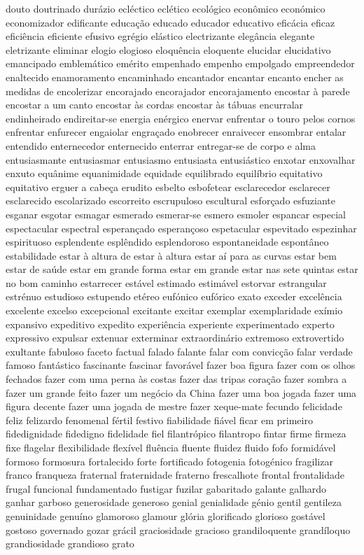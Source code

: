 \documentclass[ruledheader]{abnt_UFF}
\begin{document}
douto doutrinado dur\'{a}zio ecl\'{e}ctico ecl\'{e}tico ecol\'{o}gico econ\^{o}mico econ\'{o}mico economizador edificante educa\c{c}\~ao educado educador educativo efic\'{a}cia eficaz efici\^{e}ncia eficiente efusivo egr\'{e}gio el\'{a}stico electrizante eleg\^{a}ncia elegante eletrizante eliminar elogio elogioso eloqu\^{e}ncia eloquente elucidar elucidativo emancipado emblem\'{a}tico em\'{e}rito empenhado empenho empolgado empreendedor enaltecido enamoramento encaminhado encantador encantar encanto encher as medidas de encolerizar encorajado encorajador encorajamento encostar \`{a} parede encostar a um canto encostar \`{a}s cordas encostar \`{a}s t\'{a}buas encurralar endinheirado endireitar-se energia en\'{e}rgico enervar enfrentar o touro pelos cornos enfrentar enfurecer engaiolar engra\c{c}ado enobrecer enraivecer ensombrar entalar entendido enternecedor enternecido enterrar entregar-se de corpo e alma entusiasmante entusiasmar entusiasmo entusiasta entusi\'{a}stico enxotar enxovalhar enxuto equ\^{a}nime equanimidade equidade equilibrado equil\'{i}brio equitativo equitativo erguer a cabe\c{c}a erudito esbelto esbofetear esclarecedor esclarecer esclarecido escolarizado escorreito escrupuloso escultural esfor\c{c}ado esfuziante esganar esgotar esmagar esmerado esmerar-se esmero esmoler espancar especial espectacular espectral esperan\c{c}ado esperan\c{c}oso espetacular espevitado espezinhar espirituoso esplendente espl\^{e}ndido esplendoroso espontaneidade espont\^{a}neo estabilidade estar \`{a} altura de estar \`{a} altura estar a\'{i} para as curvas estar bem estar de sa\'{u}de estar em grande forma estar em grande estar nas sete quintas estar no bom caminho estarrecer est\'{a}vel estimado estim\'{a}vel estorvar estrangular estr\'{e}nuo estudioso estupendo et\'{e}reo euf\'{o}nico euf\'{o}rico exato exceder excel\^{e}ncia excelente excelso excepcional excitante excitar exemplar exemplaridade ex\'{i}mio expansivo expeditivo expedito experi\^{e}ncia experiente experimentado experto expressivo expulsar extenuar exterminar extraordin\'{a}rio extremoso extrovertido exultante fabuloso faceto factual falado falante falar com convic\c{c}\~ao falar verdade famoso fant\'{a}stico fascinante fascinar favor\'{a}vel fazer boa figura fazer com os olhos fechados fazer com uma perna \`{a}s costas fazer das tripas cora\c{c}\~ao fazer sombra a fazer um grande feito fazer um neg\'{o}cio da China fazer uma boa jogada fazer uma figura decente fazer uma jogada de mestre fazer xeque-mate fecundo felicidade feliz felizardo fenomenal f\'{e}rtil festivo fiabilidade fi\'{a}vel ficar em primeiro fidedignidade fidedigno fidelidade fiel filantr\'{o}pico filantropo fintar firme firmeza fixe flagelar flexibilidade flex\'{i}vel flu\^{e}ncia fluente fluidez fluido fofo formid\'{a}vel formoso formosura fortalecido forte fortificado fotogenia fotog\'{e}nico fragilizar franco franqueza fraternal fraternidade fraterno frescalhote frontal frontalidade frugal funcional fundamentado fustigar fuzilar gabaritado galante galhardo ganhar garboso generosidade generoso genial genialidade g\'{e}nio gentil gentileza genuinidade genu\'{i}no glamoroso glamour gl\'{o}ria glorificado glorioso gost\'{a}vel gostoso governado gozar gr\'{a}cil graciosidade gracioso grandiloquente grand\'{i}loquo grandiosidade grandioso grato 
\end{document}
